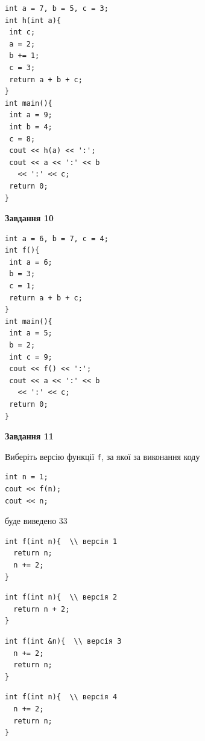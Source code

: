 \documentclass[12pt, ukrainian]{article}
\def\code#1{\Verb!#1!}
\begin{document}
{\begin {large}
\begin{minipage}[t]{7.0cm}
\begin{verbatim}
int a = 7, b = 5, c = 3;
int h(int a){
 int c;
 a = 2;
 b += 1;
 c = 3;
 return a + b + c;
}
int main(){
 int a = 9;
 int b = 4;
 c = 8;
 cout << h(a) << ':';
 cout << a << ':' << b 
   << ':' << c;
 return 0;
}
\end{verbatim}



\begin{center}
\textbf{Завдання 10}
\end{center}
\vspace{-8mm}

\begin{verbatim}
int a = 6, b = 7, c = 4;
int f(){
 int a = 6;
 b = 3;
 c = 1;
 return a + b + c;
}
int main(){
 int a = 5;
 b = 2;
 int c = 9;
 cout << f() << ':';
 cout << a << ':' << b 
   << ':' << c;
 return 0;
}
\end{verbatim}

\end{minipage}
\vline \hspace{1mm}
\begin{minipage}[t]{11.0cm}

\begin{center}
\textbf{Завдання 11}
\end{center}
Виберіть версію функції \code{f}, за якої за виконання коду
\begin{verbatim}
int n = 1;
cout << f(n);
cout << n;
\end{verbatim}

буде виведено 33

\begin{verbatim}
int f(int n){  \\ версія 1
  return n;
  n += 2;
}
\end{verbatim}

\vspace{-8mm}\begin{verbatim}
int f(int n){  \\ версія 2
  return n + 2;
}
\end{verbatim}

\vspace{-8mm}\begin{verbatim}
int f(int &n){  \\ версія 3
  n += 2;
  return n;
}
\end{verbatim}

\vspace{-8mm}\begin{verbatim}
int f(int n){  \\ версія 4
  n += 2;
  return n;
}
\end{verbatim}




\end{minipage}
\end{large}}
\end{document}
